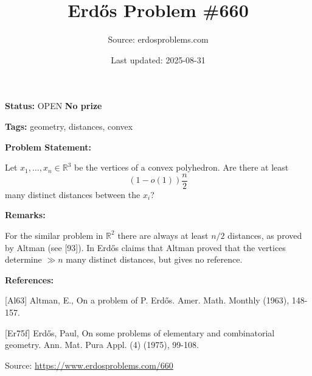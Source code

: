 \documentclass{article}
\title{Erd\H{o}s Problem \#660}
\date{Last updated: 2025-08-31}
\author{Source: erdosproblems.com}
\begin{document}
\maketitle

\noindent\textbf{Status:} OPEN \quad \textbf{No prize}

\noindent\textbf{Tags:} geometry, distances, convex

\medskip
\noindent\textbf{Problem Statement:}

Let $x_1,\ldots,x_n\in \mathbb{R}^3$ be the vertices of a convex polyhedron. Are there at least\[(1-o(1))\frac{n}{2}\]many distinct distances between the $x_i$?

\bigskip
\noindent\textbf{Remarks:}

For the similar problem in $\mathbb{R}^2$ there are always at least $n/2$ distances, as proved by Altman \cite{Al63} (see [93]). In \cite{Er75f} Erd\H{o}s claims that Altman proved that the vertices determine $\gg n$ many distinct distances, but gives no reference.

\bigskip
\noindent\textbf{References:}

[Al63] Altman, E., On a problem of P. Erd\H{o}s. Amer. Math. Monthly (1963), 148-157.
 
 [Er75f] Erd\H{o}s, Paul, On some problems of elementary and combinatorial geometry. Ann. Mat. Pura Appl. (4) (1975), 99-108.

\bigskip
\noindent\small{Source: \url{https://www.erdosproblems.com/660}}
\end{document}

